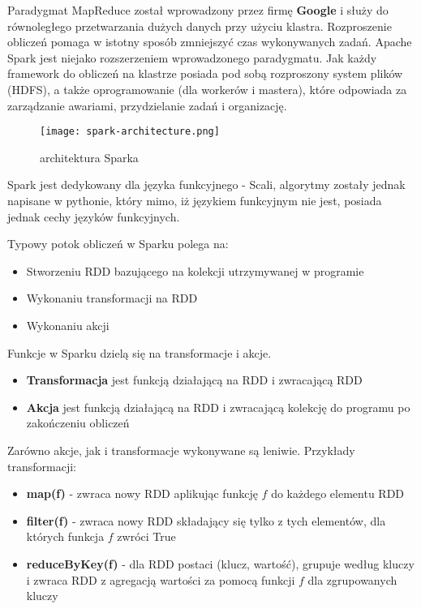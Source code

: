 \documentclass[magisterska]{pracamgr}
\theoremstyle{plain}
\theoremstyle{definition}
\theoremstyle{remark}
\begin{document}
Paradygmat MapReduce został wprowadzony przez firmę \textbf{Google} i służy do równoległego przetwarzania
dużych danych przy użyciu klastra.
Rozproszenie obliczeń pomaga w istotny sposób zmniejszyć czas wykonywanych zadań.
Apache Spark jest niejako rozszerzeniem wprowadzonego paradygmatu. 
Jak każdy framework do obliczeń na klastrze posiada pod sobą rozproszony system plików (HDFS), 
a także oprogramowanie (dla workerów i mastera), które odpowiada za zarządzanie awariami, przydzielanie 
zadań i organizację. 
\newpage

\begin{figure}
 \caption{architektura Sparka}
 \texttt{[image: spark-architecture.png]}
\end{figure}

Spark jest dedykowany dla języka funkcyjnego - Scali, algorytmy zostały jednak napisane w pythonie, który 
mimo, iż językiem funkcyjnym nie jest, posiada jednak cechy języków funkcyjnych. 

Typowy potok obliczeń w Sparku polega na:
\begin{itemize}
 \item Stworzeniu RDD bazującego na kolekcji utrzymywanej w programie
 \item Wykonaniu transformacji na RDD
 \item Wykonaniu akcji
\end{itemize}

Funkcje w Sparku dzielą się na transformacje i akcje. 
\begin{itemize}
 \item \textbf{Transformacja} jest funkcją działającą na RDD i zwracającą RDD
 \item \textbf{Akcja} jest funkcją działającą na RDD i zwracającą kolekcję do programu po zakończeniu obliczeń
\end{itemize}
Zarówno akcje, jak i transformacje wykonywane są leniwie. Przykłady transformacji:
\begin{itemize}
 \item \textbf{map(f)} - zwraca nowy RDD aplikując funkcję $f$ do każdego elementu RDD
 \item \textbf{filter(f)} - zwraca nowy RDD składający się tylko z tych elementów, dla których funkcja $f$ zwróci True
 \item \textbf{reduceByKey(f)} - dla RDD postaci (klucz, wartość), grupuje według kluczy i zwraca RDD z agregacją wartości 
 za pomocą funkcji $f$ dla zgrupowanych kluczy
\end{itemize}
\end{document}
